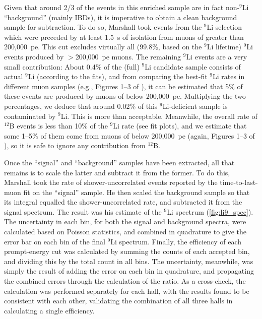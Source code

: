 \documentclass[../thesis.tex]{subfiles}
\begin{document}
Given that around 2/3 of the events in this enriched sample are in fact non-$^9$Li ``background'' (mainly IBDs), it is imperative to obtain a clean background sample for subtraction. To do so, Marshall took events from the $^9$Li selection which were preceded by at least 1.5~s of isolation from muons of greater than 200,000~pe. This cut excludes virtually all (99.8\%, based on the $^9$Li lifetime) $^9$Li events produced by $>$200,000~pe muons. The remaining $^9$Li events are a very small contribution: About 0.4\% of the (full) $^9$Li candidate sample consists of actual $^9$Li (according to the fits), and from comparing the best-fit $^9$Li rates in different muon samples (e.g., Figures 1--3 of \cite{ChrisLi9}), it can be estimated that 5\% of these events are produced by muons of below 200,000~pe. Multiplying the two percentages, we deduce that around 0.02\% of this $^9$Li-deficient sample is contaminated by $^9$Li. This is more than acceptable. Meanwhile, the overall rate of $^{12}$B events is less than 10\% of the $^9$Li rate (see fit plots), and we estimate that some 1--5\% of them come from muons of below 200,000~pe (again, Figures 1--3 of \cite{ChrisLi9}), so it is safe to ignore any contribution from $^{12}$B.

Once the ``signal'' and ``background'' samples have been extracted, all that remains is to scale the latter and subtract it from the former. To do this, Marshall took the rate of shower-uncorrelated events reported by the time-to-last-muon fit on the ``signal'' sample. He then scaled the background sample so that its integral equalled the shower-uncorrelated rate, and subtracted it from the signal spectrum. The result was his estimate of the $^9$Li spectrum (\autoref{fig:li9_spec}). The uncertainty in each bin, for both the signal and background spectra, were calculated based on Poisson statistics, and combined in quadrature to give the error bar on each bin of the final $^9$Li spectrum. Finally, the efficiency of each prompt-energy cut was calculated by summing the counts of each accepted bin, and dividing this by the total count in all bins. The uncertainty, meanwhile, was simply the result of adding the error on each bin in quadrature, and propagating the combined errors through the calculation of the ratio. As a cross-check, the calculation was performed separately for each hall, with the results found to be consistent with each other, validating the combination of all three halls in calculating a single efficiency.
\end{document}

